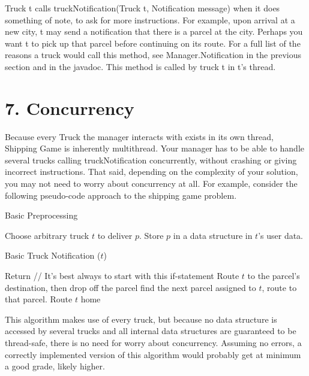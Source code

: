 \documentclass[11pt]{article}
\begin{document}
Truck t calls truckNotification(Truck t, Notification message) when it does something of note, to ask for more instructions. For example, upon arrival at a new city, t may send a notification that there is a parcel at the city. Perhaps you want t to pick up that parcel before continuing on its route. For a full list of the reasons a truck would call this method, see Manager.Notification in the previous section and in the javadoc. This method is called by truck t in t's thread. 

\section{7. Concurrency}
Because every Truck the manager interacts with exists in its own thread, Shipping Game is inherently multithread. Your manager has to be able to handle several trucks calling truckNotification concurrently, without crashing or giving incorrect instructions. That said, depending on the complexity of your solution, you may not need to worry about concurrency at all. For example, consider the following pseudo-code approach to the shipping game problem.
\begin{algorithm}
\caption{Basic Preprocessing} \label{alg:ls}
\begin{algorithmic}[1]
\STATE Choose arbitrary truck $t$ to deliver $p$. Store $p$ in a data structure in $t$'s user data.
\ENDFOR
\end{algorithmic}
\end{algorithm}
\begin{algorithm}
\caption{Basic Truck Notification ($t$)} \label{alg:ls}
\begin{algorithmic}[1]
\STATE Return      // It's best always to start with this if-statement
\ENDIF
{}
\STATE Route $t$ to the parcel's destination, then drop off the parcel
\ELSE
\STATE find the next parcel assigned to $t$, route to that parcel.
\ENDIF
\ELSE
\STATE Route $t$ home
\ENDIF
\end{algorithmic}
\end{algorithm}

This algorithm makes use of every truck, but because no data structure is accessed by several trucks and all internal data structures are guaranteed to be thread-safe, there is no need for worry about concurrency. Assuming no errors, a correctly implemented version of this algorithm  would probably get at minimum a good grade, likely higher.\\
\end{document}
